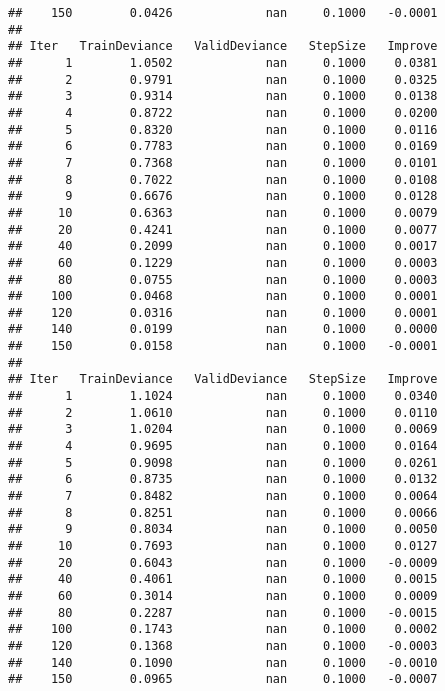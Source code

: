 \documentclass[]{article}
\begin{document}
\begin{verbatim}
##    150        0.0426             nan     0.1000   -0.0001
## 
## Iter   TrainDeviance   ValidDeviance   StepSize   Improve
##      1        1.0502             nan     0.1000    0.0381
##      2        0.9791             nan     0.1000    0.0325
##      3        0.9314             nan     0.1000    0.0138
##      4        0.8722             nan     0.1000    0.0200
##      5        0.8320             nan     0.1000    0.0116
##      6        0.7783             nan     0.1000    0.0169
##      7        0.7368             nan     0.1000    0.0101
##      8        0.7022             nan     0.1000    0.0108
##      9        0.6676             nan     0.1000    0.0128
##     10        0.6363             nan     0.1000    0.0079
##     20        0.4241             nan     0.1000    0.0077
##     40        0.2099             nan     0.1000    0.0017
##     60        0.1229             nan     0.1000    0.0003
##     80        0.0755             nan     0.1000    0.0003
##    100        0.0468             nan     0.1000    0.0001
##    120        0.0316             nan     0.1000    0.0001
##    140        0.0199             nan     0.1000    0.0000
##    150        0.0158             nan     0.1000   -0.0001
## 
## Iter   TrainDeviance   ValidDeviance   StepSize   Improve
##      1        1.1024             nan     0.1000    0.0340
##      2        1.0610             nan     0.1000    0.0110
##      3        1.0204             nan     0.1000    0.0069
##      4        0.9695             nan     0.1000    0.0164
##      5        0.9098             nan     0.1000    0.0261
##      6        0.8735             nan     0.1000    0.0132
##      7        0.8482             nan     0.1000    0.0064
##      8        0.8251             nan     0.1000    0.0066
##      9        0.8034             nan     0.1000    0.0050
##     10        0.7693             nan     0.1000    0.0127
##     20        0.6043             nan     0.1000   -0.0009
##     40        0.4061             nan     0.1000    0.0015
##     60        0.3014             nan     0.1000    0.0009
##     80        0.2287             nan     0.1000   -0.0015
##    100        0.1743             nan     0.1000    0.0002
##    120        0.1368             nan     0.1000   -0.0003
##    140        0.1090             nan     0.1000   -0.0010
##    150        0.0965             nan     0.1000   -0.0007
\end{verbatim}
\end{document}
